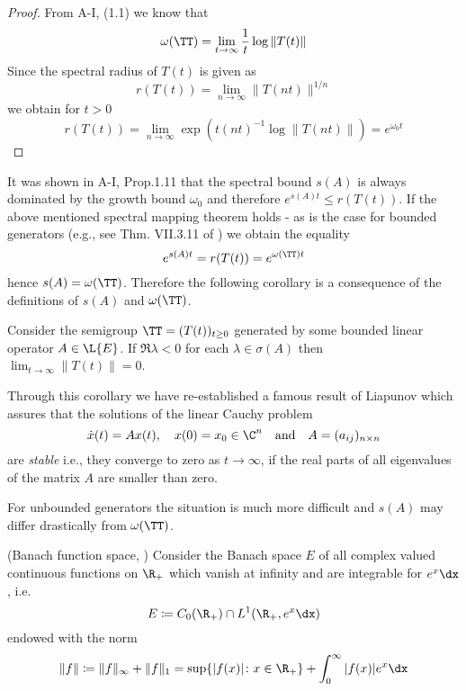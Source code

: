 \begin{proof}
From A-I, (1.1) we know that
\[
    \omega(\TT) = \lim_{t \to \infty} \frac{1}{t} \log \|T(t)\|
\]
Since the spectral radius of $T(t)$ is given as
\[
    r(T(t)) = \lim_{n \to \infty} \|T(nt)\|^{1/n}
\]
we obtain for $t > 0$
\[
    r(T(t)) = \lim_{n \to \infty} \exp(t(nt)^{-1} \log \|T(nt)\|) = e^{\omega_{0} t}
\]
\end{proof}
It was shown in A-I, Prop.1.11 that the spectral bound $s(A)$ is always dominated by the growth bound $\omega_{0}$ and therefore $e^{s(A)t} \leq r(T(t))$.
If the above mentioned spectral mapping theorem holds - as is the case for bounded generators (e.g., see Thm. VII.3.11 of \citet{dunfordschwartz:1958}) we obtain the equality
\[
    e^{s(A)t} = r(T(t)) = e^{\omega(\TT) t}
\]
hence $s(A) = \omega(\TT)$.
Therefore the following corollary is a consequence of the definitions of $s(A)$ and $\omega(\TT)$.
\begin{corollary}\label{cor:a3-1.2}
Consider the semigroup $\TT = (T(t))_{t \geq 0}$ generated by some bounded linear operator $A \in \L{E}$.
If $\Re\lambda < 0$ for each $\lambda \in \sigma(A)$ then $\lim_{t \to \infty}\|T(t)\| = 0$.
\end{corollary}
Through this corollary we have re-established a famous result of Liapunov which assures that the solutions of the linear Cauchy problem
\[
    \dot{x}(t) = Ax(t), \quad x(0) = x_{0} \in \C^{n} \quad \text{and} \quad A = (a_{ij})_{n\times n}
\]
are \emph{stable} i.e., they converge to zero as $t \to \infty$, if the real parts of all eigenvalues of the matrix $A$ are smaller than zero.

For unbounded generators the situation is much more difficult and $s(A)$ may differ drastically from $\omega(\TT)$.
\begin{example}\label{ex:a3-1.3}
(Banach function space, \citet{greinervoigtwolff:1981})
Consider the Banach space $E$ of all complex valued continuous functions on $\R_{+}$ which vanish at infinity and are integrable for $e^{x}\dx$, i.e.
\[
    E \coloneqq C_{0}(\R_{+}) \cap L^{1}(\R_{+}, e^{x}\dx)
\]
endowed with the norm
\[
    \|f\| \coloneqq \|f\|_{\infty} + \|f\|_{1} = \sup\{|f(x)| \colon x \in \R_{+}\} + \int_{0}^{\infty} |f(x)|e^{x} \dx
\]
\end{example}


